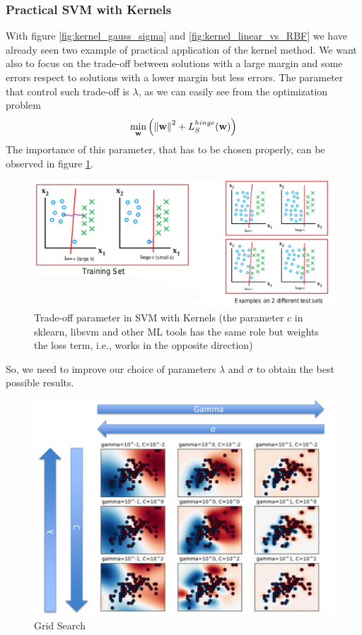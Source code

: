 \documentclass[12pt]{report}
\theoremstyle{plain}
\begin{document}
\begin{flushleft}
\subsubsection{Practical SVM with Kernels}
With figure \ref{fig:kernel_gauss_sigma} and \ref{fig:kernel_linear_vs_RBF} we have already seen two example of practical application of the kernel method. We want also to focus on the trade-off between solutions with a large margin and some errors respect to solutions with a lower margin but less errors. The parameter that control such trade-off is $\lambda$, as we can easily see from the optimization problem
\[ \min_{\vb{w}}\left(\norm{\vb{w}}^2+L_S^{hinge}(\vb{w})\right) \]
The importance of this parameter, that has to be chosen properly, can be observed in figure \ref{fig:kernel_lambda}.
\begin{figure}[!h]
	\centering
	\includegraphics[scale=0.6]{images/kernel_lambda.pdf}
	\caption{Trade-off parameter in SVM with Kernels (the parameter $c$ in sklearn, libsvm and other ML tools has the same role but weights the loss term, i.e., works in the opposite direction)}
	\label{fig:kernel_lambda}
\end{figure}

So, we need to improve our choice of parameters $\lambda$ and $\sigma$ to obtain the best possible results.
\begin{figure}[!h]
	\centering
	\includegraphics[scale=0.5]{images/kernel_grid_search.pdf}
	\caption{Grid Search}
	\label{fig:kernel_grid_search}
\end{figure}



\end{flushleft}
\end{document}
